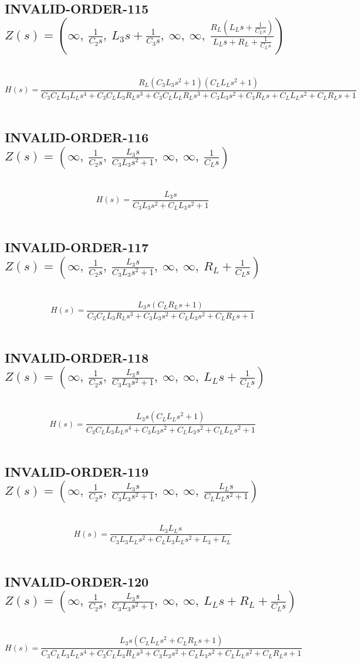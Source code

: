 \documentclass{article}
\begin{document}
\subsection{INVALID-ORDER-115 $Z(s) = \left( \infty, \  \frac{1}{C_{2} s}, \  L_{3} s + \frac{1}{C_{3} s}, \  \infty, \  \infty, \  \frac{R_{L} \left(L_{L} s + \frac{1}{C_{L} s}\right)}{L_{L} s + R_{L} + \frac{1}{C_{L} s}}\right)$ } \ 
\textbf{\[H(s) = \frac{R_{L} \left(C_{3} L_{3} s^{2} + 1\right) \left(C_{L} L_{L} s^{2} + 1\right)}{C_{3} C_{L} L_{3} L_{L} s^{4} + C_{3} C_{L} L_{3} R_{L} s^{3} + C_{3} C_{L} L_{L} R_{L} s^{3} + C_{3} L_{3} s^{2} + C_{3} R_{L} s + C_{L} L_{L} s^{2} + C_{L} R_{L} s + 1}\] } \ 
\subsection{INVALID-ORDER-116 $Z(s) = \left( \infty, \  \frac{1}{C_{2} s}, \  \frac{L_{3} s}{C_{3} L_{3} s^{2} + 1}, \  \infty, \  \infty, \  \frac{1}{C_{L} s}\right)$ } \ 
\textbf{\[H(s) = \frac{L_{3} s}{C_{3} L_{3} s^{2} + C_{L} L_{3} s^{2} + 1}\] } \ 
\subsection{INVALID-ORDER-117 $Z(s) = \left( \infty, \  \frac{1}{C_{2} s}, \  \frac{L_{3} s}{C_{3} L_{3} s^{2} + 1}, \  \infty, \  \infty, \  R_{L} + \frac{1}{C_{L} s}\right)$ } \ 
\textbf{\[H(s) = \frac{L_{3} s \left(C_{L} R_{L} s + 1\right)}{C_{3} C_{L} L_{3} R_{L} s^{3} + C_{3} L_{3} s^{2} + C_{L} L_{3} s^{2} + C_{L} R_{L} s + 1}\] } \ 
\subsection{INVALID-ORDER-118 $Z(s) = \left( \infty, \  \frac{1}{C_{2} s}, \  \frac{L_{3} s}{C_{3} L_{3} s^{2} + 1}, \  \infty, \  \infty, \  L_{L} s + \frac{1}{C_{L} s}\right)$ } \ 
\textbf{\[H(s) = \frac{L_{3} s \left(C_{L} L_{L} s^{2} + 1\right)}{C_{3} C_{L} L_{3} L_{L} s^{4} + C_{3} L_{3} s^{2} + C_{L} L_{3} s^{2} + C_{L} L_{L} s^{2} + 1}\] } \ 
\subsection{INVALID-ORDER-119 $Z(s) = \left( \infty, \  \frac{1}{C_{2} s}, \  \frac{L_{3} s}{C_{3} L_{3} s^{2} + 1}, \  \infty, \  \infty, \  \frac{L_{L} s}{C_{L} L_{L} s^{2} + 1}\right)$ } \ 
\textbf{\[H(s) = \frac{L_{3} L_{L} s}{C_{3} L_{3} L_{L} s^{2} + C_{L} L_{3} L_{L} s^{2} + L_{3} + L_{L}}\] } \ 
\subsection{INVALID-ORDER-120 $Z(s) = \left( \infty, \  \frac{1}{C_{2} s}, \  \frac{L_{3} s}{C_{3} L_{3} s^{2} + 1}, \  \infty, \  \infty, \  L_{L} s + R_{L} + \frac{1}{C_{L} s}\right)$ } \ 
\textbf{\[H(s) = \frac{L_{3} s \left(C_{L} L_{L} s^{2} + C_{L} R_{L} s + 1\right)}{C_{3} C_{L} L_{3} L_{L} s^{4} + C_{3} C_{L} L_{3} R_{L} s^{3} + C_{3} L_{3} s^{2} + C_{L} L_{3} s^{2} + C_{L} L_{L} s^{2} + C_{L} R_{L} s + 1}\] } \ 
\end{document}
